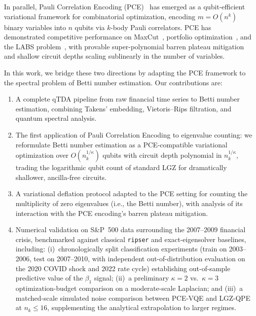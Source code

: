 \documentclass[conference,10pt]{IEEEtran}
\begin{document}
In parallel, Pauli Correlation Encoding (PCE)~\cite{Sciorilli24} has
emerged as a qubit-efficient variational framework for combinatorial
optimization, encoding $m = O(n^k)$ binary variables into $n$ qubits via
$k$-body Pauli correlators. PCE has demonstrated competitive performance
on MaxCut~\cite{Sciorilli24}, portfolio
optimization~\cite{PCEportfolio25}, and the LABS
problem~\cite{PCElabs25}, with provable super-polynomial barren plateau
mitigation and shallow circuit depths scaling sublinearly in the number
of variables.

In this work, we bridge these two directions by adapting the PCE
framework to the spectral problem of Betti number estimation. Our
contributions are:

\begin{enumerate}
    \item A complete qTDA pipeline from raw financial time series to
    Betti number estimation, combining Takens' embedding,
    Vietoris--Rips filtration, and quantum spectral analysis.

    \item The first application of Pauli Correlation Encoding to
    eigenvalue counting: we reformulate Betti number estimation as a
    PCE-compatible variational optimization over $O(n_k^{1/\kappa})$
    qubits with circuit depth polynomial in $n_k^{1/\kappa}$, trading
    the logarithmic qubit count of standard LGZ for dramatically
    shallower, ancilla-free circuits.

    \item A variational deflation protocol adapted to the PCE setting
    for counting the multiplicity of zero eigenvalues (i.e., the Betti
    number), with analysis of its interaction with the PCE encoding's
    barren plateau mitigation.

    \item Numerical validation on S\&P~500 data surrounding the
    2007--2009 financial crisis, benchmarked against classical
    \texttt{ripser} and exact-eigensolver baselines, including:
    (i)~chronologically split classification experiments
    (train on 2003--2006, test on 2007--2010, with independent
    out-of-distribution evaluation on the 2020 COVID shock and 2022
    rate cycle) establishing out-of-sample predictive value of the
    $\beta_1$ signal; (ii)~a preliminary $\kappa=2$ vs.\ $\kappa=3$
    optimization-budget comparison on a moderate-scale Laplacian; and
    (iii)~a matched-scale
    simulated noise comparison between PCE-VQE and LGZ-QPE at
    $n_k \leq 16$, supplementing the analytical extrapolation to
    larger regimes.
\end{enumerate}
\end{document}
